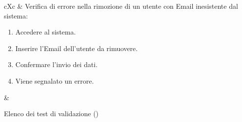 \begin{table}[H]
\begin{VTtable}[1.7]{\textwidth}{cXc}
        \addtotv & Verifica di errore nella rimozione di un utente con Email inesistente dal sistema:
		\begin{enumerate}
			\item Accedere al sistema.
            \item Inserire l'Email dell'utente da rimuovere.
            \item Confermare l'invio dei dati.
            \item Viene segnalato un errore.
		\end{enumerate}
		& \TNI \\
        \bottomrule
	\end{VTtable}
	\caption{Elenco dei test di validazione (\thetableCounter)}
\end{table}

